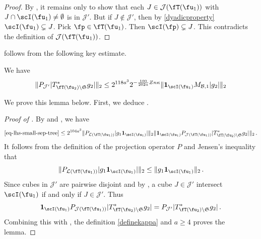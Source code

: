     \begin{proof}
        By , it remains only to show that each $J \in \mathcal{J}(\fT(\fu_1))$ with $J \cap \scI(\fu_1) \ne \emptyset$ is in $\mathcal{J}'$. But if $J \notin \mathcal{J}'$, then by \eqref{dyadicproperty} $\scI(\fu_1) \subsetneq J$. Pick $\fp \in \fT(\fu_1)$. Then $\scI(\fp) \subsetneq J$. This contradicts the definition of $\mathcal{J}(\fT(\fu_1))$.
    \end{proof}

     follows from the following key estimate.

    \begin{lemma}
        \label{bound-for-tree-projection}
        \leanok
        We have
        $$
            \|P_{\mathcal{J}'}|T_{\fT(\fu_2) \setminus \mathfrak{S}}^* g_2|\|_2
            \le 2^{118a^3} 2^{-\frac{100}{202a}Zn\kappa} \|\mathbf{1}_{\scI(\fu_1)} M_{\mathcal{B},1} |g_2|\|_2
        $$
    \end{lemma}

    We prove this lemma below. First, we deduce .

    \begin{proof}[Proof of ]
        By  and , we have
        \begin{align*}
            \eqref{eq-lhs-small-sep-tree} \le 2^{104a^3} \|P_{\mathcal{L}(\fT(\fu_1))} |g_1\mathbf{1}_{\scI(\fu_1)}| \|_2 \|\mathbf{1}_{\scI(\fu_1)} P_{\mathcal{J}(\fT(\fu_1) )}|T_{\fT(\fu_2) \setminus \mathfrak{S}}^* g_2|\|_2\,.
        \end{align*}
        It follows from the definition of the projection operator $P$ and Jensen's inequality that
        $$
            \|P_{\mathcal{L}(\fT(\fu_1))} |g_1\mathbf{1}_{\scI(\fu_1)}| \|_2 \le \|g_1 \mathbf{1}_{\scI(\fu_1)}\|_2\,.
        $$
        Since cubes in $\mathcal{J}'$ are pairwise disjoint and by , a cube $J \in \mathcal{J}'$ intersect $\scI(\fu_1)$ if and only if $J \in \mathcal{J}'$. Thus
        $$
            \mathbf{1}_{\scI(\fu_1)} P_{\mathcal{J}(\fT(\fu_1) )}|T_{\fT(\fu_2) \setminus \mathfrak{S}}^* g_2| = P_{\mathcal{J}'}|T_{\fT(\fu_2) \setminus \mathfrak{S}}^* g_2|\,.
        $$
        Combining this with , the definition \eqref{definekappa} and $a \ge 4$ proves the lemma.
    \end{proof}

